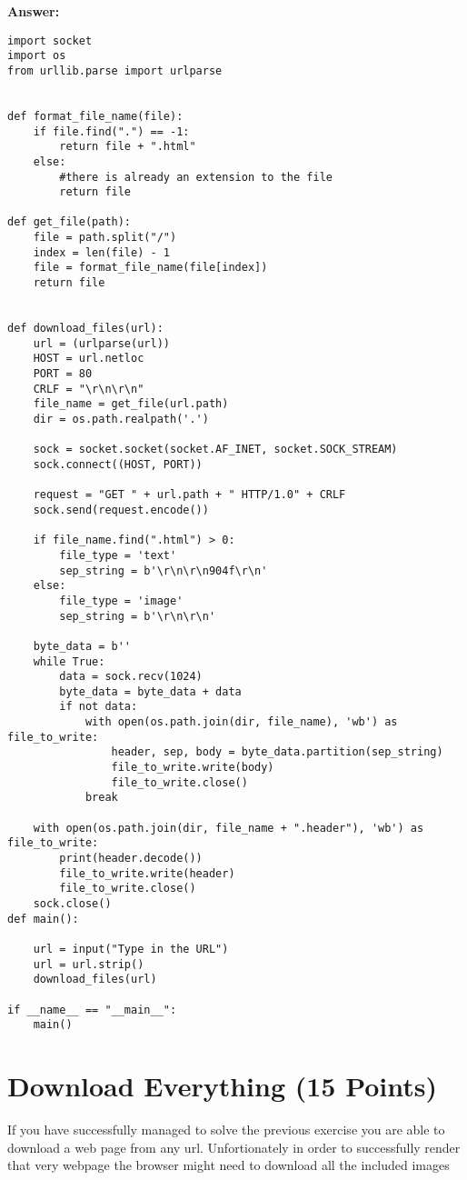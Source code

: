 \documentclass{WeSTassignment}
\begin{document}
 \textbf{Answer: } \\
\begin{lstlisting}
import socket
import os
from urllib.parse import urlparse


def format_file_name(file):
    if file.find(".") == -1:
        return file + ".html"
    else:
        #there is already an extension to the file
        return file

def get_file(path):
    file = path.split("/")
    index = len(file) - 1
    file = format_file_name(file[index])
    return file


def download_files(url):
    url = (urlparse(url))
    HOST = url.netloc
    PORT = 80
    CRLF = "\r\n\r\n"
    file_name = get_file(url.path)
    dir = os.path.realpath('.')

    sock = socket.socket(socket.AF_INET, socket.SOCK_STREAM)
    sock.connect((HOST, PORT))

    request = "GET " + url.path + " HTTP/1.0" + CRLF
    sock.send(request.encode())

    if file_name.find(".html") > 0:
        file_type = 'text'
        sep_string = b'\r\n\r\n904f\r\n'
    else:
        file_type = 'image'
        sep_string = b'\r\n\r\n'

    byte_data = b''
    while True:
        data = sock.recv(1024)
        byte_data = byte_data + data
        if not data:
            with open(os.path.join(dir, file_name), 'wb') as file_to_write:
                header, sep, body = byte_data.partition(sep_string)
                file_to_write.write(body)
                file_to_write.close()
            break

    with open(os.path.join(dir, file_name + ".header"), 'wb') as file_to_write:
        print(header.decode())
        file_to_write.write(header)
        file_to_write.close()
    sock.close()
def main():

    url = input("Type in the URL")
    url = url.strip()
    download_files(url)

if __name__ == "__main__":
    main()
\end{lstlisting}


\section{Download Everything (15 Points)}

If you have successfully managed to solve the previous exercise you are able to download a web page from any url. Unfortionately in order to successfully render that very webpage the browser might need to download all the included images
\end{document}

